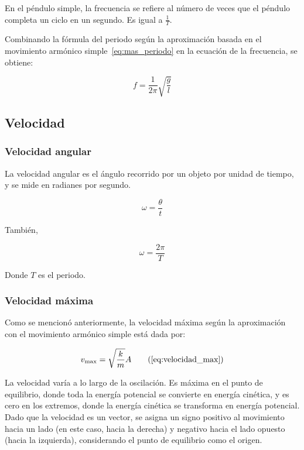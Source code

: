 \documentclass[twocolumn]{report}
\numberwithin{table}{section}
\begin{document}
En el péndulo simple, la frecuencia se refiere al número de veces que el péndulo
completa un ciclo en un segundo. Es igual a $\frac{1}{T}$.

Combinando la fórmula del periodo según la aproximación basada en
el movimiento armónico simple~\eqref{eq:mas_periodo} en la ecuación de la
frecuencia, se obtiene:

\begin{equation}
  f = \frac{1}{2\pi}\sqrt{\frac{g}{l}}
\end{equation}

\subsection{Velocidad}

\subsubsection{Velocidad angular}

La velocidad angular es el ángulo recorrido por un objeto por unidad
de tiempo, y se mide en radianes por segundo.

\begin{equation}
  \omega = \frac{\theta}{t} \label{eq:velocidad_angular}
\end{equation}

También,

\begin{equation}
  \omega = \frac{2\pi}{T}
\end{equation}

Donde $T$ es el periodo.

\subsubsection{Velocidad máxima}

Como se mencionó anteriormente, la velocidad máxima según la
aproximación con el movimiento armónico simple está dada por:

\begin{equation}
  v_{\max} = \sqrt{\frac{k}{m}}A \tag{\ref{eq:velocidad_max}}
\end{equation}

La velocidad varía a lo largo de la oscilación. Es máxima en el punto
de equilibrio, donde toda la energía potencial se convierte en
energía cinética, y es cero en los extremos, donde la energía
cinética se transforma en energía potencial. Dado que la velocidad es
un vector, se asigna un signo positivo al movimiento hacia un lado
(en este caso, hacia la derecha) y negativo hacia el lado opuesto
(hacia la izquierda), considerando el punto de equilibrio como el origen.
\end{document}
